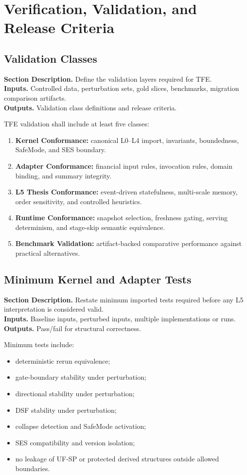 \documentclass[11pt]{report}
\newcommand{\meta}[3]{\textbf{Section Description.} #1\\
\textbf{Inputs.} #2\\
\textbf{Outputs.} #3\par}
\begin{document}
\chapter{Verification, Validation, and Release Criteria}
\section{Validation Classes}
\meta{Define the validation layers required for TFE.}{Controlled data, perturbation sets, gold slices, benchmarks, migration comparison artifacts.}{Validation class definitions and release criteria.}

TFE validation shall include at least five classes:
\begin{enumerate}[leftmargin=1.2cm]
    \item \textbf{Kernel Conformance:} canonical L0--L4 import, invariants, boundedness, SafeMode, and SES boundary.
    \item \textbf{Adapter Conformance:} financial input rules, invocation rules, domain binding, and summary integrity.
    \item \textbf{L5 Thesis Conformance:} event-driven statefulness, multi-scale memory, order sensitivity, and controlled heuristics.
    \item \textbf{Runtime Conformance:} snapshot selection, freshness gating, serving determinism, and stage-skip semantic equivalence.
    \item \textbf{Benchmark Validation:} artifact-backed comparative performance against practical alternatives.
\end{enumerate}

\section{Minimum Kernel and Adapter Tests}
\meta{Restate minimum imported tests required before any L5 interpretation is considered valid.}{Baseline inputs, perturbed inputs, multiple implementations or runs.}{Pass/fail for structural correctness.}

Minimum tests include:
\begin{itemize}
    \item deterministic rerun equivalence;
    \item gate-boundary stability under perturbation;
    \item directional stability under perturbation;
    \item DSF stability under perturbation;
    \item collapse detection and SafeMode activation;
    \item SES compatibility and version isolation;
    \item no leakage of UF-SP or protected derived structures outside allowed boundaries.
\end{itemize}
\end{document}
